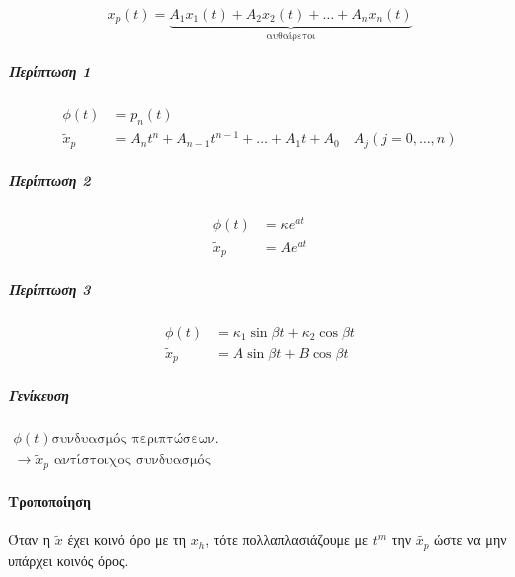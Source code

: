 \documentclass[11pt,a4paper,titlepage,draft]{article}
\begin{document}
\[
x_p(t) = \underbrace{A_1x_1(t)+A_2x_2(t) + \dots + A_nx_n(t)}_{\text{αυθαίρετοι}}
\]

\subparagraph{Περίπτωση 1}
\begin{align*}
\phi(t)&=p_n(t)\\
\tilde x_p &= A_nt^n+A_{n-1}t^{n-1}+\dots+A_1t+A_0\quad A_j (j=0,\dots,n)
\end{align*}

\subparagraph{Περίπτωση 2}
\begin{align*}
\phi(t)&=\kappa e^{at}\\
\tilde x_p &= Ae^{at}
\end{align*}

\subparagraph{Περίπτωση 3}
\begin{align*}
\phi(t) &= \kappa_1\sin\beta t + \kappa_2\cos\beta t\\
\tilde x_p &= A\sin\beta t + B\cos\beta t
\end{align*}

\subparagraph{Γενίκευση}
\(
\begin{matrix}
	\phi(t) \text {συνδυασμός περιπτώσεων.}               \\
	\rightarrow \tilde x_p \text{ αντίστοιχος συνδυασμός}
\end{matrix}
\)

\paragraph{Τροποποίηση}
Όταν η \(\widetilde{x}\) έχει κοινό όρο με τη \(x_h\), τότε πολλαπλασιάζουμε με \(t^m\) την \(\widetilde{x_p}\) ώστε να μην υπάρχει κοινός όρος.
\end{document}
